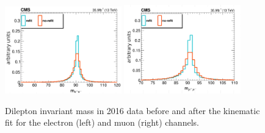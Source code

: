 \begin{figure}[tb]
	\begin{center}
		\includegraphics[width=0.45\textwidth]{fig/selection/kinfit_data_el.png}
		\includegraphics[width=0.45\textwidth]{fig/selection/kinfit_data_mu.png}
	\end{center}
	\caption{Dilepton invariant mass in 2016 data before and after the kinematic fit for the electron (left) and muon (right) channels.}
	\label{fig:kinfit}
\end{figure}
%
